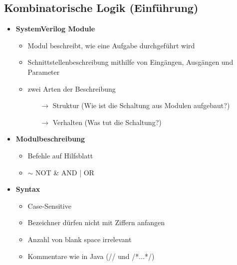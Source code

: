 \documentclass[11pt,a4paper]{article}
\begin{document}
\subsection{Kombinatorische Logik (Einführung)}
\begin{itemize}

\item \textbf{SystemVerilog Module}
	\begin{itemize}
	\item Modul beschreibt, wie eine Aufgabe durchgeführt wird
	\item Schnittstellenbeschreibung mithilfe von Eingängen, Ausgängen und Parameter
	\item zwei Arten der Beschreibung
	\begin{itemize}
	\item[$\rightarrow$] Struktur (Wie ist die Schaltung aus Modulen aufgebaut?)
		\item[$\rightarrow$] Verhalten (Was tut die Schaltung?)
	\end{itemize}
		
	\end{itemize}
	
\item \textbf{Modulbeschreibung}
	\begin{itemize}
	\item Befehle auf Hilfsblatt
	\item $\sim$ NOT   \& AND   | OR
	\end{itemize}
	
\item \textbf{Syntax}
	\begin{itemize}
	\item Case-Sensitive
	\item Bezeichner dürfen nicht mit Ziffern anfangen
	\item Anzahl von blank space irrelevant
	\item Kommentare wie in Java (// und /*...*/)
	\end{itemize}

\end{itemize}
\end{document}
